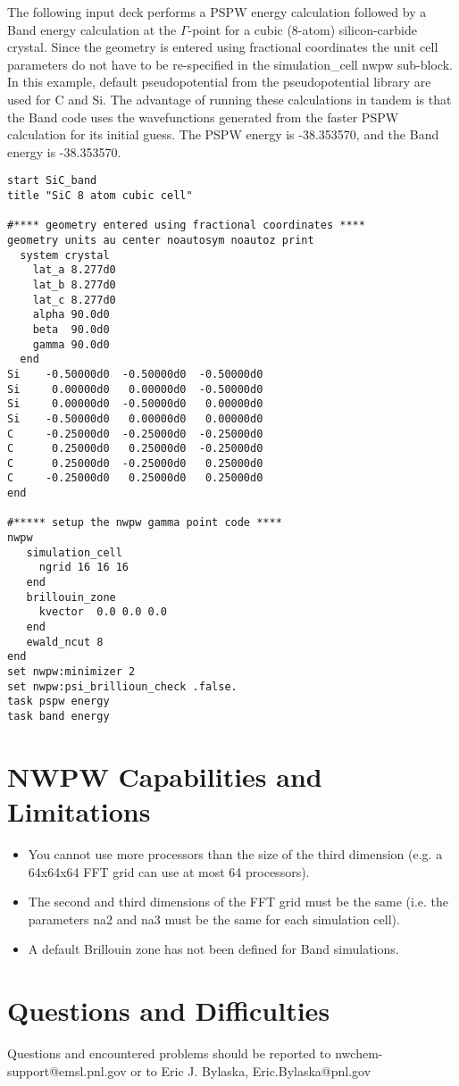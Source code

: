 The following input deck performs a PSPW energy calculation followed
by a Band energy calculation at the $\Gamma$-point  for a cubic (8-atom) 
silicon-carbide crystal.  Since the geometry is entered using fractional coordinates
the unit cell parameters do not have to be re-specified in the simulation\_cell
nwpw sub-block.  In this example, default pseudopotential from the pseudopotential
library are used for C and Si.  The advantage of running these calculations in tandem is that
the Band code uses the wavefunctions generated from the faster PSPW calculation for
its initial guess.  The PSPW energy is -38.353570, and the Band energy is -38.353570.
 
\begin{verbatim}
start SiC_band
title "SiC 8 atom cubic cell"

#**** geometry entered using fractional coordinates ****
geometry units au center noautosym noautoz print 
  system crystal 
    lat_a 8.277d0
    lat_b 8.277d0
    lat_c 8.277d0
    alpha 90.0d0
    beta  90.0d0
    gamma 90.0d0
  end
Si    -0.50000d0  -0.50000d0  -0.50000d0
Si     0.00000d0   0.00000d0  -0.50000d0
Si     0.00000d0  -0.50000d0   0.00000d0
Si    -0.50000d0   0.00000d0   0.00000d0
C     -0.25000d0  -0.25000d0  -0.25000d0
C      0.25000d0   0.25000d0  -0.25000d0
C      0.25000d0  -0.25000d0   0.25000d0
C     -0.25000d0   0.25000d0   0.25000d0
end

#***** setup the nwpw gamma point code ****
nwpw
   simulation_cell
     ngrid 16 16 16
   end
   brillouin_zone
     kvector  0.0 0.0 0.0
   end
   ewald_ncut 8
end
set nwpw:minimizer 2
set nwpw:psi_brillioun_check .false.
task pspw energy
task band energy
\end{verbatim}


\section{NWPW Capabilities and Limitations}
\label{sec:pspw_limits}
\normalsize

\begin{itemize}
\item You cannot use more processors than the size of the third dimension 
  (e.g. a 64x64x64 FFT grid can use at most 64 processors).
\item The second and third dimensions of the FFT grid must be the same 
  (i.e. the parameters na2 and na3 must be the same for each simulation cell).
\item A default Brillouin zone has not been defined for Band simulations.
\end{itemize}


\section{Questions and Difficulties}
\normalsize

Questions and encountered problems should be reported to 
nwchem-support@emsl.pnl.gov 
or to Eric J. Bylaska, Eric.Bylaska@pnl.gov





